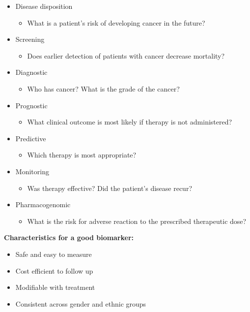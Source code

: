\begin{itemize}
    \item Disease disposition
        \begin{itemize}
            \item What is a patient's risk of developing cancer in the future?
        \end{itemize}
    \item Screening
        \begin{itemize}
            \item Does earlier detection of patients with cancer decrease
                mortality?
        \end{itemize}
    \item Diagnostic
        \begin{itemize}
            \item Who has cancer? What is the grade of the cancer?
        \end{itemize}
    \item Prognostic
        \begin{itemize}
            \item What clinical outcome is most likely if therapy is not
                administered?
        \end{itemize}
    \item Predictive
        \begin{itemize}
            \item Which therapy is most appropriate?
        \end{itemize}
    \item Monitoring
        \begin{itemize}
            \item Was therapy effective? Did the patient's disease recur?
        \end{itemize}
    \item Pharmacogenomic
        \begin{itemize}
            \item What is the risk for adverse reaction to the prescribed
                therapeutic dose?
        \end{itemize}
\end{itemize}
\textbf{Characteristics for a good biomarker:}
\begin{itemize}
    \item Safe and easy to measure
    \item Cost efficient to follow up
    \item Modifiable with treatment
    \item Consistent across gender and ethnic groups
\end{itemize}

